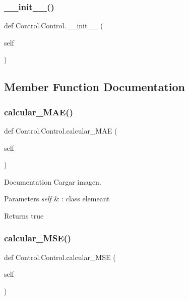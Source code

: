 \subsubsection{\texorpdfstring{\+\_\+\+\_\+init\+\_\+\+\_\+()}{\_\_init\_\_()}}
{\footnotesize\ttfamily def Control.\+Control.\+\_\+\+\_\+init\+\_\+\+\_\+ (\begin{DoxyParamCaption}\item[{}]{self }\end{DoxyParamCaption})}



\subsection{Member Function Documentation}
\mbox{\label{class_control_1_1_control_a01b94321309bbd777b1d147559ba8163}} 
\subsubsection{\texorpdfstring{calcular\+\_\+\+M\+A\+E()}{calcular\_MAE()}}
{\footnotesize\ttfamily def Control.\+Control.\+calcular\+\_\+\+M\+AE (\begin{DoxyParamCaption}\item[{}]{self }\end{DoxyParamCaption})}



Documentation Cargar imagen. 


\begin{DoxyParams}{Parameters}
{\em self} & \+: class elemeant \\
\hline
\end{DoxyParams}
\begin{DoxyReturn}{Returns}
true 
\end{DoxyReturn}
\mbox{\label{class_control_1_1_control_ae634564c3406e0fe8fe8cc1e53f8a924}} 
\subsubsection{\texorpdfstring{calcular\+\_\+\+M\+S\+E()}{calcular\_MSE()}}
{\footnotesize\ttfamily def Control.\+Control.\+calcular\+\_\+\+M\+SE (\begin{DoxyParamCaption}\item[{}]{self }\end{DoxyParamCaption})}



